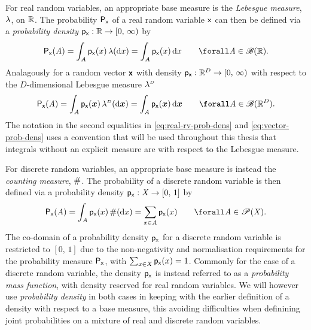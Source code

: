 For real random variables, an appropriate base measure is the \emph{Lebesgue measure}, $\lebm{1}$, on $\mathbb{R}$. The probability $\mathsf{P}_{\mathsf{x}}$ of a real random variable $\mathsf{x}$ can then be defined via a \emph{probability density} $\mathsf{p}_{\mathsf{x}} : \mathbb{R} \to [0,\,\infty)$ by
\begin{equation}\label{eq:real-rv-prob-dens}
    \prob{\rvar{x}}(\set{A})
    = \int_{\set{A}} \pden{\rvar{x}}(x) \,\lebm{1}(\dr x)
    = \int_{\set{A}} \pden{\rvar{x}}(x) \,\dr x
    \qquad
    \forall \set{A} \in \borel(\reals).
\end{equation}
Analagously for a random vector $\boldsymbol{\mathsf{x}}$ with density $\mathsf{p}_{\boldsymbol{\mathsf{x}}} : \mathbb{R}^D \to [0,\,\infty)$ with respect to the $D$-dimensional Lebesgue measure $\lebm{D}$
\begin{equation}\label{eq:vector-prob-dens}
    \prob{\rvct{x}}(\set{A})
    = \int_{\set{A}} \pden{\rvct{x}}(\vct{x}) \,\lebm{D}(\dr \vct{x})
    = \int_{\set{A}} \pden{\rvct{x}}(\vct{x}) \,\dr \vct{x}
    \qquad
    \forall \set{A} \in \borel(\reals^D).
\end{equation}
The notation in the second equalities in \eqref{eq:real-rv-prob-dens} and \eqref{eq:vector-prob-dens} uses a convention that will be used throughout this thesis that integrals without an explicit measure are with respect to the Lebesgue measure. 

For discrete random variables, an appropriate base measure is instead the \emph{counting measure}, $\#$. The probability of a discrete random variable is then defined via a probability density $\mathsf{p}_{\mathsf{x}} : \mathit{X} \to [0,\,1]$ by
\begin{equation}
    \prob{\rvar{x}}(\set{A})
    = \int_{\set{A}} \pden{\rvar{x}}(x) \,\countm(\dr x)
    = \sum_{x \in \set{A}} \pden{\rvar{x}}(x) 
    \qquad
    \forall \set{A} \in \powerset(\set{X}).
\end{equation}
The co-domain of a probability density $\mathsf{p}_{\mathsf{x}}$ for a discrete random variable is restricted to $[0,\,1]$ due to the non-negativity and normalisation requirements for the probability measure $\mathsf{P}_{\mathsf{x}}$, with $\sum_{x\in\mathit{X}} \mathsf{p}_{\mathsf{x}}(x) = 1$. Commonly for the case of a discrete random variable, the density $\mathsf{p}_{\mathsf{x}}$ is instead referred to as a \emph{probability mass function}, with density reserved for real random variables. We will however use \emph{probability density} in both cases in keeping with the earlier definition of a density with respect to a base measure, this avoiding difficulties when definining joint probabilities on a mixture of real and discrete random variables.

